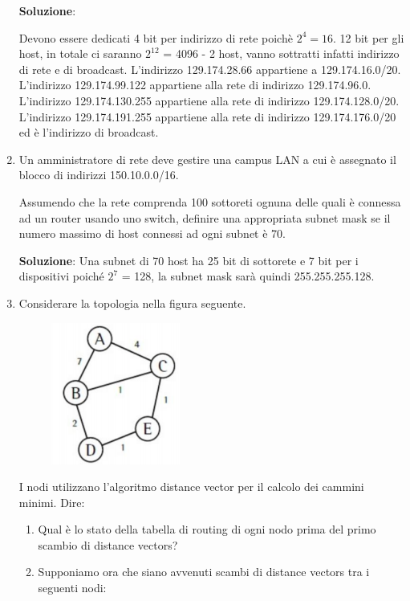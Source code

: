 \documentclass[11pt,a4paper,oneside]{book}
\theoremstyle{definition}
\begin{document}
\begin{enumerate}
	      \textbf{Soluzione}:

	      Devono essere dedicati 4 bit per indirizzo di rete poichè $2^{4} = 16$.
	      12 bit per gli host, in totale ci saranno $2^{12}$ = 4096 - 2 host, vanno sottratti infatti indirizzo di rete e di broadcast.
	      L'indirizzo 129.174.28.66 appartiene a 129.174.16.0/20.
	      L'indirizzo 129.174.99.122 appartiene alla rete di indirizzo 129.174.96.0.
	      L'indirizzo 129.174.130.255 appartiene alla rete di indirizzo 129.174.128.0/20.
	      L'indirizzo 129.174.191.255 appartiene alla rete di indirizzo 129.174.176.0/20 ed è l'indirizzo di broadcast.

	\item Un amministratore di rete deve gestire una campus LAN a cui è assegnato il blocco di indirizzi 150.10.0.0/16.

	      Assumendo che la rete comprenda 100 sottoreti ognuna delle quali è connessa ad un router usando uno switch, definire una appropriata subnet mask se il numero massimo di host connessi ad ogni subnet è 70.

	      \textbf{Soluzione}: Una subnet di 70 host ha 25 bit di sottorete e 7 bit per i dispositivi poiché $2^{7}$ = 128, la subnet mask sarà quindi 255.255.255.128.

	      \pagebreak

	\item Considerare la topologia nella figura seguente.

	      \begin{figure}[!h]
		      \includegraphics[scale=0.5]{Immagini/Es11.png}
		      \centering
	      \end{figure}

	      I nodi utilizzano l’algoritmo distance vector per il calcolo dei cammini minimi. Dire:
	      \begin{enumerate}
		      \item Qual è lo stato della tabella di routing di ogni nodo prima del primo scambio di distance vectors?
		      \item Supponiamo ora che siano avvenuti scambi di distance vectors tra i seguenti nodi:


\end{enumerate}
\end{enumerate}
\end{document}
